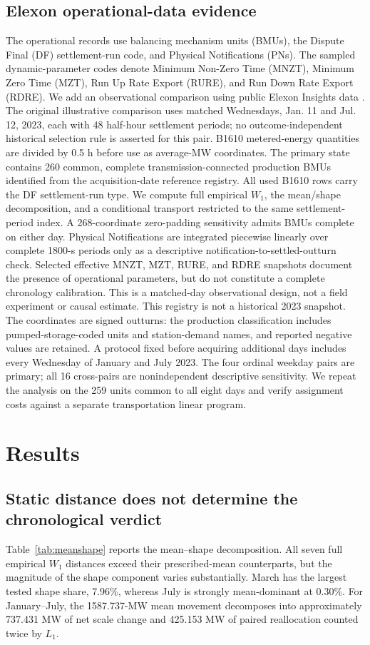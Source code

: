 \documentclass[journal]{IEEEtran}
\begin{document}
\subsection{Elexon operational-data evidence}
The operational records use balancing mechanism units (BMUs), the Dispute Final (DF) settlement-run code, and Physical Notifications (PNs). The sampled dynamic-parameter codes denote Minimum Non-Zero Time (MNZT), Minimum Zero Time (MZT), Run Up Rate Export (RURE), and Run Down Rate Export (RDRE).
We add an observational comparison using public Elexon Insights data \cite{ElexonInsights}. The original illustrative comparison uses matched Wednesdays, Jan. 11 and Jul. 12, 2023, each with 48 half-hour settlement periods; no outcome-independent historical selection rule is asserted for this pair. B1610 metered-energy quantities are divided by 0.5 h before use as average-MW coordinates. The primary state contains 260 common, complete transmission-connected production BMUs identified from the acquisition-date reference registry. All used B1610 rows carry the DF settlement-run type. We compute full empirical $W_1$, the mean/shape decomposition, and a conditional transport restricted to the same settlement-period index. A 268-coordinate zero-padding sensitivity admits BMUs complete on either day. Physical Notifications are integrated piecewise linearly over complete 1800-s periods only as a descriptive notification-to-settled-outturn check. Selected effective MNZT, MZT, RURE, and RDRE snapshots document the presence of operational parameters, but do not constitute a complete chronology calibration. This is a matched-day observational design, not a field experiment or causal estimate. This registry is not a historical 2023 snapshot. The coordinates are signed outturns: the production classification includes pumped-storage-coded units and station-demand names, and reported negative values are retained. A protocol fixed before acquiring additional days includes every Wednesday of January and July 2023. The four ordinal weekday pairs are primary; all 16 cross-pairs are nonindependent descriptive sensitivity. We repeat the analysis on the 259 units common to all eight days and verify assignment costs against a separate transportation linear program.

\section{Results}
\subsection{Static distance does not determine the chronological verdict}
Table~\ref{tab:meanshape} reports the mean--shape decomposition. All seven full empirical $W_1$ distances exceed their prescribed-mean counterparts, but the magnitude of the shape component varies substantially. March has the largest tested shape share, 7.96\%, whereas July is strongly mean-dominant at 0.30\%. For January--July, the 1587.737-MW mean movement decomposes into approximately 737.431 MW of net scale change and 425.153 MW of paired reallocation counted twice by $L_1$.
\end{document}
